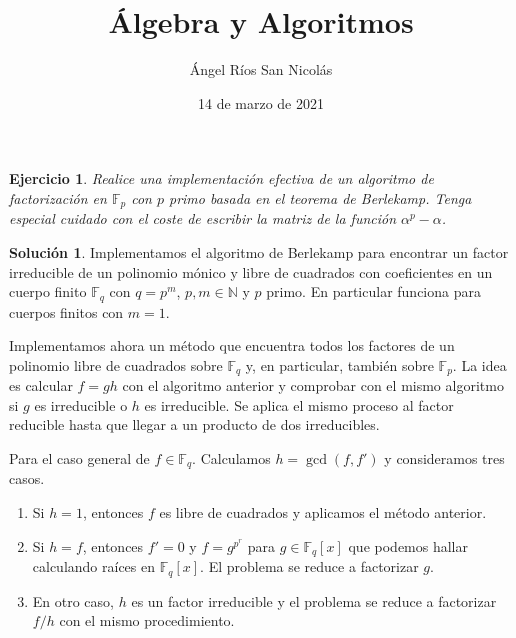 \documentclass[10pt]{article}
\title{\textbf{\huge Álgebra y Algoritmos}}
\author{Ángel Ríos San Nicolás}
\date{14 de marzo de 2021}
\newtheorem{ejer}{Ejercicio}
\theoremstyle{definition}
\newtheorem*{sol}{Solución}
\begin{document}
\maketitle
\begin{ejer} Realice una implementación efectiva de un algoritmo de factorización en $\mathbb{F
}_p$ con $p$ primo basada en el teorema de Berlekamp. Tenga especial cuidado con el coste de escribir la matriz de la función $\alpha^p-\alpha$.
\end{ejer}
\begin{sol} Implementamos el algoritmo de Berlekamp para encontrar un factor irreducible de un polinomio mónico y libre de cuadrados con coeficientes en un cuerpo finito $\mathbb{F}_q$ con $q=p^m$, $p,m\in\mathbb{N}$ y $p$ primo. En particular funciona para cuerpos finitos con $m=1$.


Implementamos ahora un método que encuentra todos los factores de un polinomio libre de cuadrados sobre $\mathbb{F}_q$ y, en particular, también sobre $\mathbb{F}_p$. La idea es calcular $f=gh$ con el algoritmo anterior y comprobar con el mismo algoritmo si $g$ es irreducible o $h$ es irreducible. Se aplica el mismo proceso al factor reducible hasta que llegar a un producto de dos irreducibles.


Para el caso general de $f\in\mathbb{F}_q$. Calculamos $h=\gcd(f,f')$ y consideramos tres casos.
\begin{enumerate}
    \item Si $h=1$, entonces $f$ es libre de cuadrados y aplicamos el método anterior.
    \item Si $h=f$, entonces $f'=0$ y $f=g^{p^r}$ para $g\in\mathbb{F}_q[x]$ que podemos hallar calculando raíces en $\mathbb{F}_q[x]$. El problema se reduce a factorizar $g$.
    \item En otro caso, $h$ es un factor irreducible y el problema se reduce a factorizar $f/h$ con el mismo procedimiento.
\end{enumerate}


\end{sol}
\end{document}
